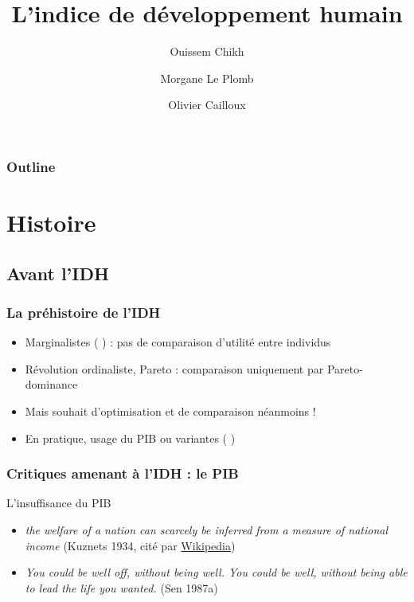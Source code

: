 \documentclass[french]{beamer}
\title[IDH]{L’indice de développement humain}
\author[Ouissem, Morgane, Olivier]{Ouissem Chikh \and Morgane Le Plomb \and Olivier Cailloux}
\institute[Éco du dev, L3]{Économie du développement, L3}
\date{\formatdate{30}{9}{2024}}
\begin{document}
\begin{frame}[plain]
	\titlepage
\end{frame}
\addtocounter{framenumber}{-1}

\begin{frame}
	\frametitle{Outline}
	\tableofcontents[hideallsubsections, sectionstyle=shaded/show]
\end{frame}


\section{Histoire}
\subsection{Avant l’IDH}
\begin{frame}
	\frametitle{La préhistoire de l’IDH}
  \begin{itemize}
    \item Marginalistes ( ) : pas de comparaison d’utilité entre individus
    \item Révolution \og{}ordinaliste\fg{}, Pareto : comparaison uniquement par Pareto-dominance
    \item Mais souhait d’optimisation et de comparaison néanmoins !
    \item En pratique, usage du PIB ou variantes ( )
  \end{itemize}
\end{frame}

\begin{frame}
	\frametitle{Critiques amenant à l’IDH : le PIB}
  \begin{block}{L’insuffisance du PIB}
    \begin{itemize}
      \item \emph{the welfare of a nation can scarcely be inferred from a measure of national income} {\small (Kuznets 1934, cité par \href{https://en.wikipedia.org/wiki/Simon_Kuznets\#National_income_accounts}{Wikipedia})} %
      \item \emph{You could be well off, without being well. You could be well, without being able to lead the life you wanted.} {\small (Sen 1987a)}%
    \end{itemize}
  \end{block}
\end{frame}
\end{document}
